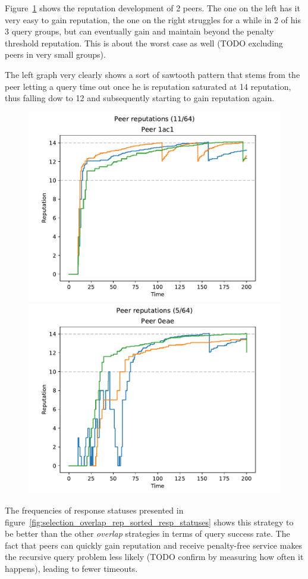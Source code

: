 Figure~\ref{fig:selection_overlap_rep_sorted_peer_reps} shows the reputation
development of 2 peers. The one on the left has it very easy to gain reputation,
the one on the right struggles for a while in 2 of his 3 query groups, but can
eventually gain and maintain beyond the penalty threshold reputation. This is
about the worst case as well (TODO excluding peers in very small groups).

The left graph very clearly shows a sort of sawtooth pattern that stems from the
peer letting a query time out once he is reputation saturated at 14 reputation,
thus falling dow to 12 and subsequently starting to gain reputation again.

\begin{figure}[t]
\centering
\includegraphics[width=0.5\columnwidth]{figures/selection_overlap_rep_sorted_peer_reps_11_of_64}%
\includegraphics[width=0.5\columnwidth]{figures/selection_overlap_rep_sorted_peer_reps_5_of_64}
\label{fig:selection_overlap_rep_sorted_peer_reps}
\end{figure}

The frequencies of response statuses presented in
figure~\ref{fig:selection_overlap_rep_sorted_resp_statuses} shows this
strategy to be better than the other \emph{overlap} strategies in terms of query
success rate. The fact that peers can quickly gain reputation and receive
penalty-free service makes the recursive query problem less likely (TODO confirm
by measuring how often it happens), leading to fewer timeouts.

